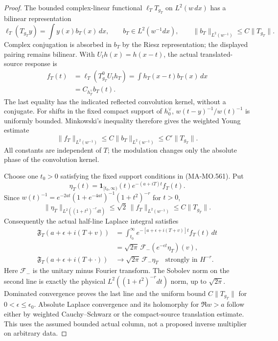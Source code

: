 \begin{proof}
The bounded complex-linear functional $\ell_T T_{g_T}$ on
$L^2(w\,dx)$ has a bilinear representation
\[
       \ell_T(T_{g_T}y)=\int y(x)b_T(x)\,dx,\qquad
       b_T\in L^2(w^{-1}dx),\qquad
       \|b_T\|_{L^2(w^{-1})}\le C\|T_{g_T}\|.
\tag{MA-MO.1508}
\]
Complex conjugation is absorbed in $b_T$ by the Riesz
representation; the displayed pairing remains bilinear.
With $U_th(x)=h(x-t)$, the actual translated-source response is
\[
\begin{aligned}
 f_T(t)&=\ell_T(T_{g_T}^0U_th_T)
        =\int h_T(x-t)b_T(x)\,dx\\
       &=C_{h_T^\vee}b_T(t).
\end{aligned}
\tag{MA-MO.1509}
\]
The last equality has the indicated reflected convolution
kernel, without a conjugate.  For shifts in the fixed compact
support of $h_0^\vee$, $w(t-y)^{-1}/w(t)^{-1}$ is uniformly
bounded.  Minkowski's inequality therefore gives the weighted
Young estimate
\[
       \|f_T\|_{L^2(w^{-1})}
          \le C\|b_T\|_{L^2(w^{-1})}
          \le C'\|T_{g_T}\|.
\tag{MA-MO.1510}
\]
All constants are independent of $T$; the modulation changes
only the absolute phase of the convolution kernel.

Choose one $t_0>0$ satisfying the fixed support conditions
in (MA-MO.561).  Put
\[
       \eta_T(t)=\mathbf1_{[t_0,\infty)}(t)
                      e^{-(a+iT)t}f_T(t).
\tag{MA-MO.1511}
\]
Since
$w(t)^{-1}=e^{-2at}(1+e^{-4at})^{-1}(1+t^2)^{-r}$ for $t>0$,
\[
 \|\eta_T\|_{L^2((1+t^2)^{-r}dt)}
           \le\sqrt2\,\|f_T\|_{L^2(w^{-1})}
           \le C\|T_{g_T}\|.
\tag{MA-MO.1512}
\]
Consequently the actual half-line Laplace integral satisfies
\[
\begin{aligned}
 \mathfrak F_T(a+\epsilon+i(T+v))
   &=\int_{t_0}^{\infty}
             e^{-[a+\epsilon+i(T+v)]t}f_T(t)\,dt\\
   &=\sqrt{2\pi}\,\mathcal F_-
                      (e^{-\epsilon t}\eta_T)(v),\\
 \mathfrak F_T(a+\epsilon+i(T+\cdot))
   &\longrightarrow \sqrt{2\pi}\,\mathcal F_-\eta_T
                           \quad\text{strongly in }H^{-r}.
\end{aligned}
\tag{MA-MO.1513}
\]
Here $\mathcal F_-$ is the unitary minus Fourier transform.
The Sobolev norm on the second line is exactly the physical
$L^2((1+t^2)^{-r}dt)$ norm, up to $\sqrt{2\pi}$.
Dominated convergence proves the last line and the uniform
bound $C\|T_{g_T}\|$ for $0<\epsilon\le\epsilon_0$.
Absolute Laplace convergence and its holomorphy for
$\Re w>a$ follow either by weighted Cauchy--Schwarz or
the compact-source translation estimate.  This uses the
assumed bounded actual column, not a proposed inverse
multiplier on arbitrary data.


\end{proof}

